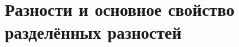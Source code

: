 \documentclass[__main__.tex]{subfiles}
\begin{document}
\section{Разности и основное свойство разделённых разностей}
\end{document}
